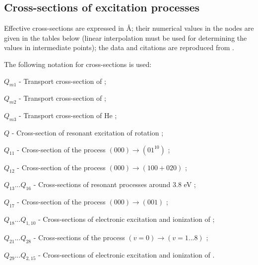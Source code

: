 \documentclass{report}
\begin{document}
\begin{appendices}


\chapter{Cross-sections of excitation processes}
\label{appendix:crossections}

Effective cross-sections are expressed in Å; their numerical values in the nodes are given in the tables below (linear interpolation must be used for determining the values in intermediate points); the data and citations are reproduced from \cite{Karlov-1978}.


The following notation for cross-sections is used:

$Q_{m1}$ - Transport cross-section of  \cite{Lowke-1973};

$Q_{m2}$ - Transport cross-section of  \cite{Frost-1962};

$Q_{m3}$ - Transport cross-section of He \cite{Lowke-1973};

$Q$ - Cross-section of resonant excitation of  rotation  \cite{Oksyuk-1966,Chandra-1973};

$Q_{11}$ - Cross-section of the process $(000)\rightarrow(01^10)$  \cite{Lowke-1973};

$Q_{12}$ - Cross-section of the process $(000)\rightarrow(100+020)$  \cite{Lowke-1973};

$Q_{13}...Q_{16}$ - Cross-sections of resonant processes around 3.8 eV  \cite{Lowke-1973};

$Q_{17}$ - Cross-section of the process $(000)\rightarrow(001)$  \cite{Lowke-1973};

$Q_{18}...Q_{1,10}$ - Cross-sections of electronic excitation and ionization of   \cite{Hake-1967};

$Q_{21}...Q_{28}$ - Cross-sections of the process $(v=0)\rightarrow$$(v=1...8)$ \cite{Phelps-1968,Schulz-1962,Engelhardt-1964};

$Q_{29}...Q_{2,15}$ - Cross-sections of electronic excitation and ionization of  \cite{Engelhardt-1964}. 


\end{appendices}
\end{document}
